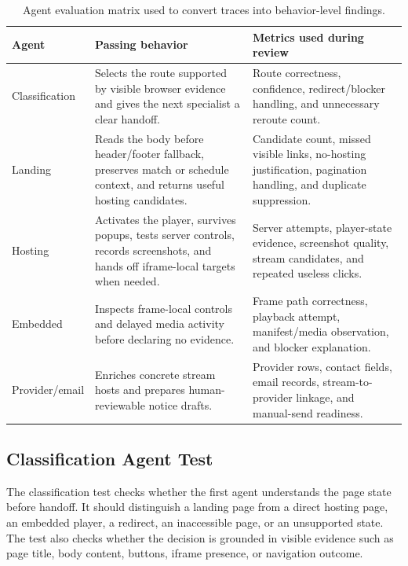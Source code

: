 \begin{table}[!htbp]
\centering
\small
\begin{tabularx}{\textwidth}{Q{2.8cm}Y Y}
\toprule
{}
Agent & Passing behavior & Metrics used during review \\
\midrule
Classification & Selects the route supported by visible browser evidence and gives the
next specialist a clear handoff. & Route correctness, confidence, redirect/blocker
handling, and unnecessary reroute count. \\
Landing & Reads the body before header/footer fallback, preserves match or schedule
context, and returns useful hosting candidates. & Candidate count, missed visible
links, no-hosting justification, pagination handling, and duplicate suppression. \\
Hosting & Activates the player, survives popups, tests server controls, records
screenshots, and hands off iframe-local targets when needed. & Server attempts,
player-state evidence, screenshot quality, stream candidates, and repeated useless
clicks. \\
Embedded & Inspects frame-local controls and delayed media activity before declaring no
evidence. & Frame path correctness, playback attempt, manifest/media observation, and
blocker explanation. \\
Provider/email & Enriches concrete stream hosts and prepares human-reviewable notice
drafts. & Provider rows, contact fields, email records, stream-to-provider linkage, and
manual-send readiness. \\
\bottomrule
\end{tabularx}
\caption{Agent evaluation matrix used to convert traces into behavior-level findings.}
\label{tab:eval-agent-matrix}
\end{table}

\subsection{Classification Agent Test}

The classification test checks whether the first agent understands the page state before
handoff. It should distinguish a landing page from a direct hosting page, an embedded
player, a redirect, an inaccessible page, or an unsupported state. The test also checks
whether the decision is grounded in visible evidence such as page title, body content,
buttons, iframe presence, or navigation outcome.



